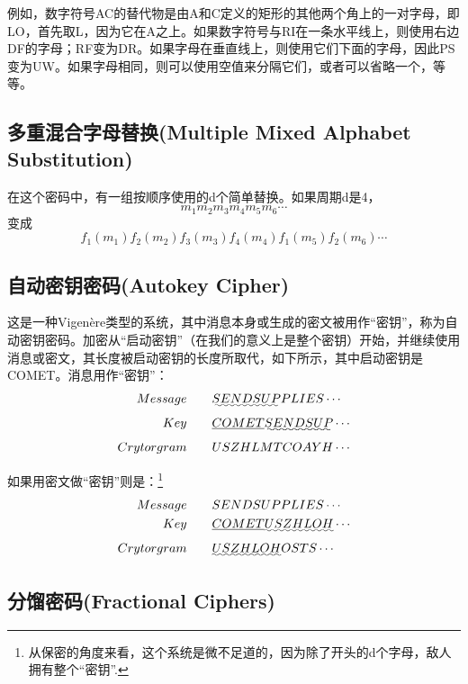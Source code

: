 \documentclass[]{article}
\begin{document}
例如，数字符号AC的替代物是由A和C定义的矩形的其他两个角上的一对字母，即LO，首先取L，因为它在A之上。如果数字符号与RI在一条水平线上，则使用右边DF的字母；RF变为DR。如果字母在垂直线上，则使用它们下面的字母，因此PS变为UW。如果字母相同，则可以使用空值来分隔它们，或者可以省略一个，等等。

\subsection{多重混合字母替换(Multiple Mixed Alphabet Substitution)}
在这个密码中，有一组按顺序使用的d个简单替换。如果周期d是4，
\[m_1m_2m_3m_4m_5m_6\cdots\]
变成
\[f_1(m_1)f_2(m_2)f_3(m_3)f_4(m_4)f_1(m_5)f_2(m_6)\cdots\]


\subsection{自动密钥密码(Autokey Cipher)}

这是一种Vigen\`{e}re类型的系统，其中消息本身或生成的密文被用作“密钥”，称为自动密钥密码。加密从“启动密钥”（在我们的意义上是整个密钥）开始，并继续使用消息或密文，其长度被启动密钥的长度所取代，如下所示，其中启动密钥是COMET。消息用作“密钥”：
\begin{equation}
	\begin{aligned}
	Message\qquad    &\uwave{SENDSUP}PLIES\cdots \\
	Key\qquad        &\underline{COMET}\uwave{SENDSUP}\cdots \\
	Crytorgram\qquad &USZHLMTCOAYH\cdots \nonumber
	\end{aligned}
\end{equation}

如果用密文做“密钥”则是：\footnote{从保密的角度来看，这个系统是微不足道的，因为除了开头的d个字母，敌人拥有整个“密钥”.}
\begin{equation}
	\begin{aligned}
		Message\qquad    &SENDSUPPLIES\cdots \\
		Key\qquad        &\underline{COMET}\uwave{USZHLOH}\cdots \\
		Crytorgram\qquad &\uwave{USZHLOH}OSTS\cdots \nonumber
		\end{aligned}
\end{equation}

\subsection{分馏密码(Fractional Ciphers)}
\end{document}
